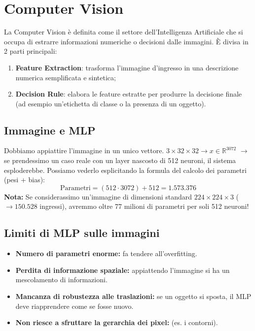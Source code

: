 \documentclass[11pt,a4paper]{article}
\begin{document}
\section{Computer Vision}

La Computer Vision è definita come il settore dell'Intelligenza Artificiale che si occupa di estrarre informazioni numeriche o decisioni dalle immagini. È divisa in 2 parti principali:
\begin{enumerate}
  \item \textbf{Feature Extraction}: trasforma l'immagine d'ingresso in una descrizione numerica semplificata e sintetica;
  \item \textbf{Decision Rule}: elabora le feature estratte per produrre la decisione finale (ad esempio un'etichetta di classe o la presenza di un oggetto).
\end{enumerate}

\subsection{Immagine e MLP}
Dobbiamo appiattire l'immagine in un unico vettore. 
$3 \times 32 \times 32 \rightarrow x \in \mathbb{R}^{3072}$ $\rightarrow$ se prendessimo un caso reale con un layer nascosto di 512 neuroni, il sistema esploderebbe. 
Possiamo vederlo esplicitando la formula del calcolo dei parametri (pesi + bias):
\[
\text{Parametri} = (512 \cdot 3072) + 512 = 1.573.376
\]
\textbf{Nota:} Se considerassimo un'immagine di dimensioni standard $224 \times 224 \times 3$ ($\rightarrow 150.528$ ingressi), avremmo oltre 77 milioni di parametri per soli 512 neuroni!

\subsection{Limiti di MLP sulle immagini}
\begin{itemize}
    \item \textbf{Numero di parametri enorme:} fa tendere all'overfitting.
    \item \textbf{Perdita di informazione spaziale:} appiattendo l'immagine si ha un mescolamento di informazioni.
    \item \textbf{Mancanza di robustezza alle traslazioni:} se un oggetto si sposta, il MLP deve riapprendere come se fosse nuovo.
    \item \textbf{Non riesce a sfruttare la gerarchia dei pixel:} (es. i contorni).
\end{itemize}
\end{document}
